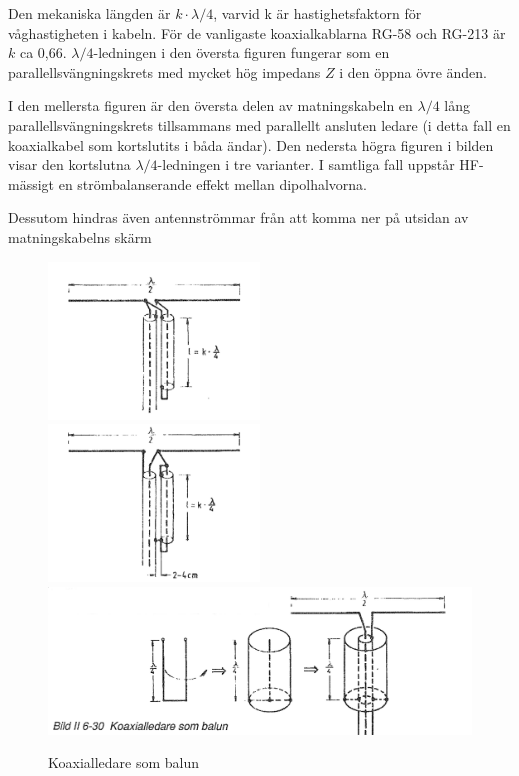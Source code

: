 Den mekaniska längden är \(k\cdot\lambda/4\), varvid k är
hastighetsfaktorn för våghastigheten i kabeln. För de vanligaste
koaxialkablarna RG-58 och RG-213 är \(k\) ca 0,66.
\(\lambda/4\)-ledningen i den översta figuren fungerar som en
parallellsvängningskrets med mycket hög impedans \(Z\) i den öppna
övre änden.

I den mellersta figuren är den översta delen av matningskabeln en
\(\lambda/4\) lång parallellsvängningskrets tillsammans med parallellt
ansluten ledare (i detta fall en koaxialkabel som kortslutits i båda
ändar). Den nedersta högra figuren i bilden visar den kortslutna
\(\lambda/4\)-ledningen i tre varianter. I samtliga fall uppstår
HF-mässigt en strömbalanserande effekt mellan dipolhalvorna.

Dessutom hindras även antennströmmar från att komma ner på utsidan av
matningskabelns skärm

\begin{figure}
  \includegraphics[width=0.5\textwidth]{images/bild_2_6-30_1}
  \includegraphics[width=0.5\textwidth]{images/bild_2_6-30_2}
  \includegraphics[width=\textwidth]{images/bild_2_6-30_3}
  \caption{Koaxialledare som balun}
  \label{fig:bildII6-30}
\end{figure}

